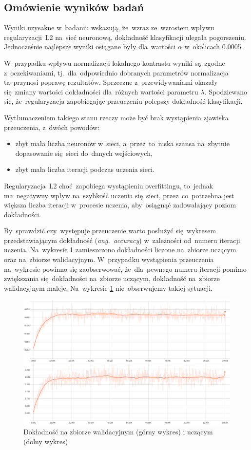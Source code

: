 \subsection{Omówienie wyników badań}
Wyniki uzysakne w~badaniu wskazują, że~wzraz ze~wzrostem wpływu regularyzacji~L2 na~sieć neuronową, dokładność
klasyfikacji ulegała pogorszeniu. Jednocześnie najlepsze wyniki osiągane były dla~wartości $\alpha$ w~okolicach 0.0005.

W~przypadku wpływu normalizacji lokalnego kontrastu wyniki są~zgodne z~oczekiwaniami, tj.~dla~odpowiednio dobranych
parametrów normalizacja ta~przynosi poprawę rezultatów. Sprzeczne z~przewidywaniami okazały się~zmiany wartości
dokładności dla~różnych wartości parametru $\lambda$. Spodziewano się, że~regularyzacja zapobiegając przeuczeniu
polepszy dokładność klasyfikacji.

Wytłumaczeniem takiego stanu rzeczy może być brak wystąpienia zjawiska przeuczenia, z~dwóch powodów:
\begin{itemize}
    \item zbyt mała liczba neuronów w~sieci, a~przez~to~niska szansa na~zbytnie dopasowanie się~sieci do~danych
          wejściowych,
    \item zbyt mała liczba iteracji podczas uczenia sieci.
\end{itemize}
Regularyzacja~L2 choć~zapobiega wystąpieniu overfittingu, to~jednak ma~negatywny wpływ na~szybkość uczenia się~sieci,
przez~co~potrzebna jest większa liczba iteracji w~procesie uczenia, aby~osiągnąć zadowalający poziom dokładności.

By~sprawdzić czy~występuje przeuczenie warto posłużyć się~wykresem przedstawiającym dokładność (\textit{ang.~accuracy})
w~zależności od~numeru iteracji uczenia. Na~wykresie \ref{rys:badanie-1} zamieszczono
dokładności liczone na~zbiorze uczącym oraz na~zbiorze walidacyjnym. W~przypadku wystąpienia przeuczenia na~wykresie
powinno się zaobserwować, że~dla~pewnego numeru iteracji pomimo zwiększania się~dokładności na~zbiorze uczącym,
dokładność na~zbiorze walidacyjnym maleje. Na~wykresie \ref{rys:badanie-1} nie~obserwujemy takiej sytuacji.

\begin{figure}[H]
	\centering
	\includegraphics[width=\linewidth]{img/badanie_1.png}
	\caption{Dokładność na zbiorze walidacyjnym (górny wykres) i uczącym (dolny wykres)}
	\label{rys:badanie-1}
\end{figure}

